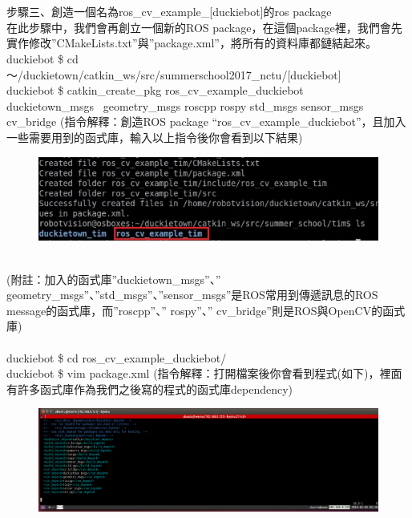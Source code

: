 \documentclass{article}
\begin{document}
\\\\步驟三、創造一個名為ros\_cv\_example\_[duckiebot]的ros package
\\在此步驟中，我們會再創立一個新的ROS package，在這個package裡，我們會先實作修改”CMakeLists.txt”與”package.xml”，將所有的資料庫都鏈結起來。
\\duckiebot \$ cd ～/duckietown/catkin\_ws/src/summerschool2017\_nctu/[duckiebot]
\\duckiebot \$ catkin\_create\_pkg ros\_cv\_example\_duckiebot 
\\duckietown\_msgs  geometry\_msgs roscpp rospy std\_msgs sensor\_msgs cv\_bridge
(指令解釋：創造ROS package “ros\_cv\_example\_duckiebot”，且加入一些需要用到的函式庫，輸入以上指令後你會看到以下結果)
\begin{figure}[htp]
    \begin{center}
        \includegraphics[width=400pt]{pic/5_2_4.png}
    \end{center}
\end{figure}
\\
(附註：加入的函式庫”duckietown\_msgs”、” geometry\_msgs”、”std\_msgs”、”sensor\_msgs”是ROS常用到傳遞訊息的ROS message的函式庫，而”roscpp”、” rospy”、” cv\_bridge”則是ROS與OpenCV的函式庫)
\\\\duckiebot \$ cd ros\_cv\_example\_duckiebot/
\\duckiebot \$ vim package.xml
(指令解釋：打開檔案後你會看到程式(如下)，裡面有許多函式庫作為我們之後寫的程式的函式庫dependency)
\begin{figure}[htp]
    \begin{center}
        \includegraphics[width=400pt]{pic/5_2_5.png}
    \end{center}
\end{figure}
\end{document}
